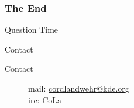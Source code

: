\documentclass[t,compress,aspectratio=169]{beamer}
\begin{document}
\begin{frame}
    \frametitle{The End}
    \vspace{0.3cm}
    \begin{block}{}
        \centering\begin{Huge}Question Time\end{Huge}
    \end{block}
    \vspace{1.1cm}
    \begin{tiny}
        \begin{block}{Contact}
            \begin{description}
                \item[Contact] mail: \url{cordlandwehr@kde.org} \\irc: CoLa
            \end{description}
        \end{block}
    \end{tiny}
\end{frame}
\end{document}
